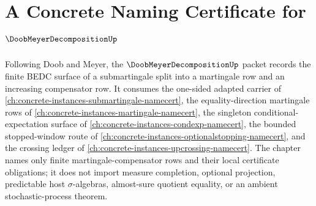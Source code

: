 \chapter{A Concrete Naming Certificate for $\DoobMeyerDecompositionUp$}
\label{ch:concrete-instances-doob-meyer-decomposition-namecert}

Following Doob and Meyer, the $\DoobMeyerDecompositionUp$ packet records the finite BEDC surface of a submartingale split into a martingale row and an increasing compensator row. It consumes the one-sided adapted carrier of \autoref{ch:concrete-instances-submartingale-namecert}, the equality-direction martingale rows of \autoref{ch:concrete-instances-martingale-namecert}, the singleton conditional-expectation surface of \autoref{ch:concrete-instances-condexp-namecert}, the bounded stopped-window route of \autoref{ch:concrete-instances-optionalstopping-namecert}, and the crossing ledger of \autoref{ch:concrete-instances-upcrossing-namecert}. The chapter names only finite martingale-compensator rows and their local certificate obligations; it does not import measure completion, optional projection, predictable host $\sigma$-algebras, almost-sure quotient equality, or an ambient stochastic-process theorem.

